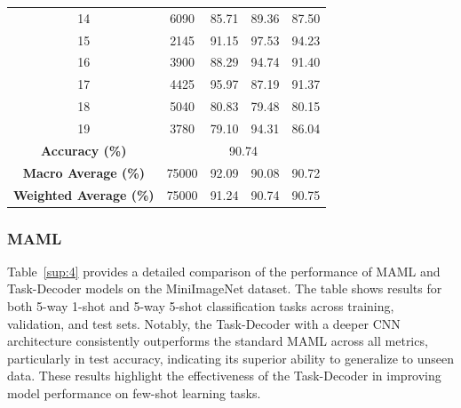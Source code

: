 \begin{table}[htbp]
{\begin{tabular}{c|c|c|c|c}
\color{black}14 & \color{black}6090  & \color{black}85.71  & \color{black}89.36  & \color{black}87.50 \\
\color{black}15 & \color{black}2145  & \color{black}91.15  & \color{black}97.53  & \color{black}94.23 \\
\color{black}16 & \color{black}3900  & \color{black}88.29  & \color{black}94.74  & \color{black}91.40 \\
\color{black}17 & \color{black}4425  & \color{black}95.97  & \color{black}87.19  & \color{black}91.37 \\
\color{black}18 & \color{black}5040  & \color{black}80.83  & \color{black}79.48  & \color{black}80.15 \\
\color{black}19 & \color{black}3780  & \color{black}79.10  & \color{black}94.31  & \color{black}86.04 \\
\hline
\color{black}\textbf{Accuracy (\%)}       & \multicolumn{4}{c|}{\color{black}90.74} \\
\color{black}\textbf{Macro Average (\%)}  & \color{black}75000 & \color{black}92.09  & \color{black}90.08  & \color{black}90.72 \\
\color{black}\textbf{Weighted Average (\%)} & \color{black}75000 & \color{black}91.24  & \color{black}90.74  & \color{black}90.75 \\
\hline
\end{tabular}%
}
\end{table}

\subsubsection{MAML}

Table~\ref{sup:4} provides a detailed comparison of the performance of MAML and Task-Decoder models on the MiniImageNet dataset. The table shows results for both 5-way 1-shot and 5-way 5-shot classification tasks across training, validation, and test sets. Notably, the Task-Decoder with a deeper CNN architecture consistently outperforms the standard MAML across all metrics, particularly in test accuracy, indicating its superior ability to generalize to unseen data. These results highlight the effectiveness of the Task-Decoder in improving model performance on few-shot learning tasks.

